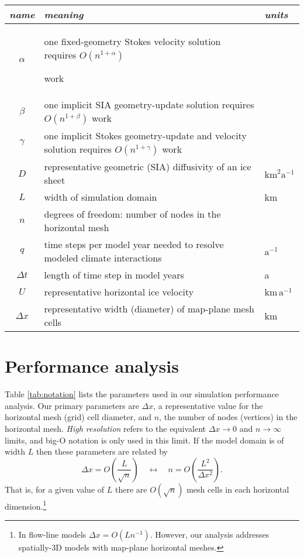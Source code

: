 \documentclass[twocolumn,letterpaper]{igs}
\begin{document}
\begin{table*}[ht]
{\normalsize
\begin{tabular}{cll}
\emph{name} & \emph{meaning} & \emph{units} \\ \hline
$\alpha$    & one fixed-geometry Stokes velocity solution requires $O(n^{1+\alpha})${\large \strut} work\\
$\beta$     & one implicit SIA geometry-update solution requires $O(n^{1+\beta})$ work \\
$\gamma$    & one implicit Stokes geometry-update and velocity solution requires $O(n^{1+\gamma})$ work \\
$D$         & representative geometric (SIA) diffusivity of an ice sheet & $\text{km}^2 \text{a}^{-1}$ \\
$L$         & width of simulation domain & km \\
$n$         & degrees of freedom: number of nodes in the horizontal mesh \\
$q$         & time steps per model year needed to resolve modeled climate interactions & $\text{a}^{-1}$ \\
$\Delta t$  & length of time step in model years & a \\
$U$         & representative horizontal ice velocity & $\text{km}\,\text{a}^{-1}$ \\
$\Delta x$  & representative width (diameter) of map-plane mesh cells & km
\end{tabular}
}
\caption{Parameters for performance analysis; $\alpha,\beta,\gamma,n$ are pure numbers.}
\label{tab:notation}
\end{table*}


\section{Performance analysis}

Table \ref{tab:notation} lists the parameters used in our simulation performance  analysis.  Our primary parameters are $\Delta x$, a representative value for the horizontal mesh (grid) cell diameter, and $n$, the number of nodes (vertices) in the horizontal mesh.  \emph{High resolution} refers to the equivalent $\Delta x\to 0$ and $n\to\infty$ limits, and big-O notation is only used in this limit.  If the model domain is of width $L$ then these parameters are related by
\begin{equation}
\Delta x = O\left(\frac{L}{\sqrt{n}}\right) \quad \leftrightarrow \quad n = O\left(\frac{L^2}{\Delta x^2}\right).  \label{eq:paramrelation}
\end{equation}
That is, for a given value of $L$ there are $O(\sqrt{n})$ mesh cells in each horizontal dimension.\footnote{In flow-line models $\Delta x = O(L n^{-1})$.  However, our analysis addresses spatially-3D models with map-plane horizontal meshes.}
\end{document}
